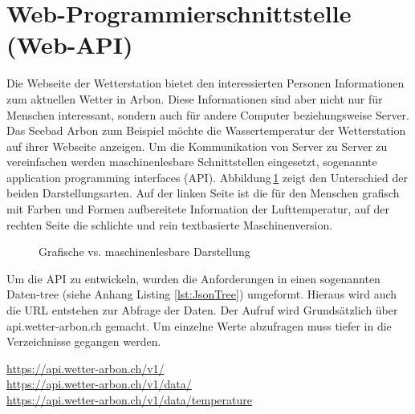 \section{ Web-Programmierschnittstelle (Web-API)}
Die Webseite der Wetterstation bietet den interessierten Personen Informationen zum aktuellen Wetter in Arbon. Diese Informationen sind aber nicht nur für Menschen interessant, sondern auch für andere Computer beziehungsweise Server. Das Seebad Arbon zum Beispiel möchte die Wassertemperatur der Wetterstation auf ihrer Webseite anzeigen. Um die Kommunikation von Server zu Server zu vereinfachen werden maschinenlesbare Schnittstellen eingesetzt, sogenannte application programming interfaces (API). Abbildung\,\ref{img:humanvsmachine} zeigt den Unterschied der beiden Darstellungsarten. Auf der linken Seite ist die für den Menschen grafisch mit Farben und Formen aufbereitete Information der Lufttemperatur, auf der rechten Seite die schlichte und rein textbasierte Maschinenversion.

\begin{figure}[htbp!]
	\centering
	\caption{Grafische vs. maschinenlesbare Darstellung}
	\label{img:humanvsmachine}
\end{figure}


Um die API zu entwickeln, wurden die Anforderungen in einen sogenannten Daten-tree (siehe Anhang Listing \ref{lst:JsonTree}) umgeformt. Hieraus wird auch die URL entstehen zur Abfrage der Daten. Der Aufruf wird Grundsätzlich über api.wetter-arbon.ch gemacht. Um einzelne Werte abzufragen muss tiefer in die Verzeichnisse gegangen werden.

\noindent
\url{https://api.wetter-arbon.ch/v1/}\\
\url{https://api.wetter-arbon.ch/v1/data/}\\
\url{https://api.wetter-arbon.ch/v1/data/temperature}\\


